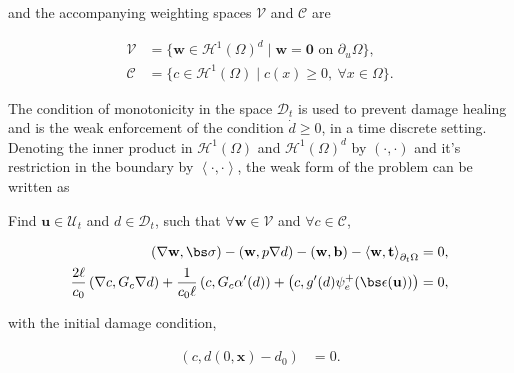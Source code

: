 \noindent and the accompanying weighting spaces $\boldsymbol{\mathcal{V}}$ and $\mathcal{C}$ are

  \begin{align}
    \boldsymbol{\mathcal{V}} & = \{ \textbf{w} \in \mathcal{H}^1(\Omega)^d \mid \textbf{w} = \boldsymbol{0} \text{ on } \partial_u\Omega \}, \\
    \mathcal{C}      & = \{ c \in \mathcal{H}^1(\Omega) \mid c(x) \ge 0,\ \forall x \in \Omega \}.                                                     
  \end{align}

The condition of monotonicity in the space $\mathcal{D}_t$ is used to prevent damage healing and is the weak enforcement of the condition $\dot d \ge 0$, in a time discrete setting. Denoting the inner product in $\mathcal{H}^1(\Omega)$ and $\mathcal{H}^1(\Omega)^d$ by $\left( \cdot, \cdot \right)$ and it's restriction in the boundary by $\left<\cdot,\cdot\right>$, the weak form of the problem can be written as


\begin{mdframed}[
    frametitle={Weak form},
    frametitlebackgroundcolor=gray!20,
    backgroundcolor=gray!5,
    linewidth=0pt,
    nobreak=true
  ]
  Find $\textbf{u} \in \boldsymbol{\mathcal{U}}_t$ and $d \in \mathcal{D}_t$, such that $\forall \textbf{w} \in \boldsymbol{\mathcal{V}}$ and $\forall c \in \mathcal{C}$,
  
    \begin{align}
      \left( \nabla \textbf{w}, \bs\sigma \right) - \left( \textbf{w}, p\nabla d \right) - \left( \textbf{w}, \textbf{b} \right) - \left< \textbf{w}, \textbf{t} \right>_{\partial_t\Omega} & = 0, \\
      \frac{2\ell}{c_0}\left( \nabla c, G_c\nabla d \right) + \frac{1}{c_0\ell}\left( c, G_c\alpha'(d) \right) + \left( c, g'(d)\psi_e^+ (\bs\epsilon(\textbf{u})) \right) & = 0,\label{weak damage equation}
    \end{align}
 
\noindent with the initial damage condition,
 
    \begin{align}
      \left( c, d(0,\textbf{x}) - d_0 \right)                & = 0.
    \end{align}
 
\end{mdframed}

